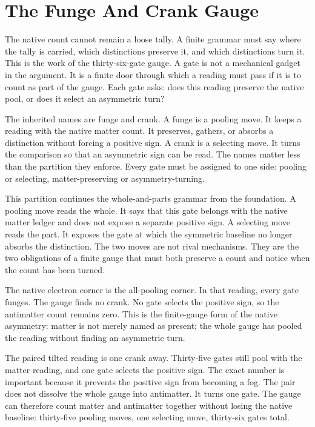 \section{The Funge And Crank Gauge}

The native count cannot remain a loose tally. A finite grammar must say where
the tally is carried, which distinctions preserve it, and which distinctions
turn it. This is the work of the thirty-six-gate gauge. A gate is not a
mechanical gadget in the argument. It is a finite door through which a
reading must pass if it is to count as part of the gauge. Each gate asks:
does this reading preserve the native pool, or does it select an asymmetric
turn?

The inherited names are funge and crank. A funge is a pooling move. It
keeps a reading with the native matter count. It preserves, gathers, or
absorbs a distinction without forcing a positive sign. A crank is a
selecting move. It turns the comparison so that an asymmetric sign can be
read. The names matter less than the partition they enforce. Every gate must
be assigned to one side: pooling or selecting, matter-preserving or
asymmetry-turning.

This partition continues the whole-and-parts grammar from the foundation. A
pooling move reads the whole. It says that this gate belongs with the native
matter ledger and does not expose a separate positive sign. A selecting move
reads the part. It exposes the gate at which the symmetric baseline no
longer absorbs the distinction. The two moves are not rival mechanisms. They
are the two obligations of a finite gauge that must both preserve a count and
notice when the count has been turned.

The native electron corner is the all-pooling corner. In that reading, every
gate funges. The gauge finds no crank. No gate selects the positive sign, so
the antimatter count remains zero. This is the finite-gauge form of the
native asymmetry: matter is not merely named as present; the whole gauge has
pooled the reading without finding an asymmetric turn.

The paired tilted reading is one crank away. Thirty-five gates still pool
with the matter reading, and one gate selects the positive sign. The exact
number is important because it prevents the positive sign from becoming a
fog. The pair does not dissolve the whole gauge into antimatter. It turns one
gate. The gauge can therefore count matter and antimatter together without
losing the native baseline: thirty-five pooling moves, one selecting move,
thirty-six gates total.

